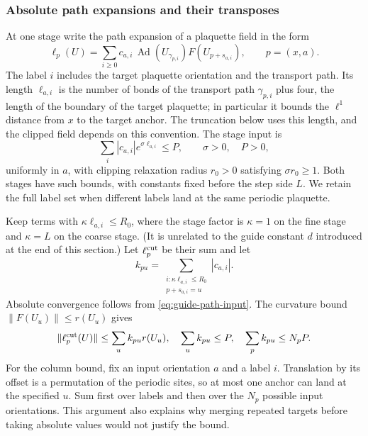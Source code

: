 \subsubsection{Absolute path expansions and their transposes}
At one stage write the path expansion of a plaquette field in the form
\[
 \ell_p(U)=\sum_{i\ge0}c_{a,i}\,
       \operatorname{Ad}(U_{\gamma_{p,i}})F(U_{p+s_{a,i}}),
 \qquad p=(x,a).
\]
The label $i$ includes the target plaquette orientation and the
transport path. Its length $\ell_{a,i}$ is the number of bonds of the
transport path $\gamma_{p,i}$ plus four, the length of the boundary of
the target plaquette; in particular it bounds the $\ell^1$ distance
from $x$ to the target anchor. The truncation below uses this length,
and the clipped field depends on this convention. The stage input is
\begin{equation}\label{eq:guide-path-input}
 \sum_i|c_{a,i}|e^{\sigma\ell_{a,i}}\le P,
 \qquad \sigma>0,\quad P>0,
\end{equation}
uniformly in $a$, with clipping relaxation radius $r_0>0$ satisfying
$\sigma r_0\ge1$. Both stages have such bounds, with constants fixed
before the step side $L$. We retain the full label set when different
labels land at the same periodic plaquette.

Keep terms with $\kappa\ell_{a,i}\le R_0$, where the stage factor is
$\kappa=1$ on the fine stage and $\kappa=L$ on the coarse stage. (It is
unrelated to the guide constant $d$ introduced at the end of this section.) Let $\ell_p^{\rm cut}$ be their sum
and let
\[
 k_{pu}=\sum_{\substack{i:\kappa\ell_{a,i}\le R_0\\p+s_{a,i}=u}}
                  |c_{a,i}|.
\]
Absolute convergence follows from \eqref{eq:guide-path-input}.
The curvature bound $\|F(U_u)\|\le r(U_u)$ gives
\begin{equation}\label{eq:guide-path-sums}
 \|\ell_p^{\rm cut}(U)\|\le\sum_u k_{pu}r(U_u),\quad
 \sum_u k_{pu}\le P,\quad \sum_p k_{pu}\le N_pP.
\end{equation}
For the column bound, fix an input orientation $a$ and a label $i$.
Translation by its offset is a permutation of the periodic sites,
so at most one anchor can land at the specified $u$. Sum first over
labels and then over the $N_p$ possible input orientations. This
argument also explains why merging repeated targets before taking
absolute values would not justify the bound.

